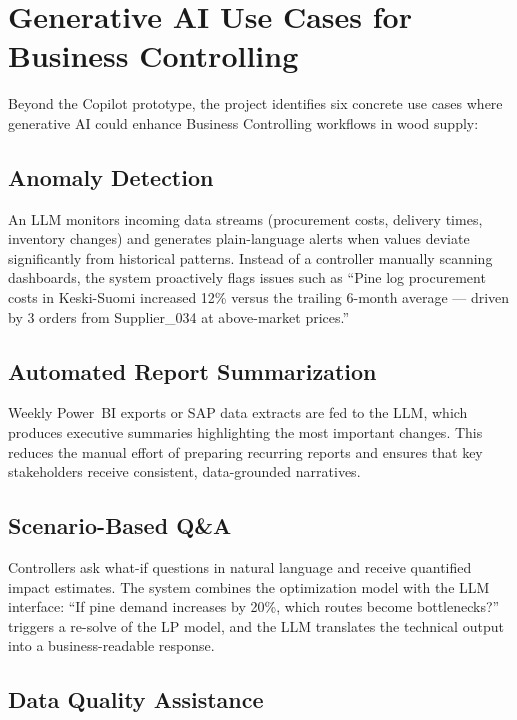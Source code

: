 \documentclass[11pt,a4paper]{article}
\begin{document}
\section{Generative AI Use Cases for Business Controlling}

Beyond the Copilot prototype, the project identifies six concrete use cases where generative AI could enhance Business Controlling workflows in wood supply:

\subsection{Anomaly Detection}

An LLM monitors incoming data streams (procurement costs, delivery times, inventory changes) and generates plain-language alerts when values deviate significantly from historical patterns. Instead of a controller manually scanning dashboards, the system proactively flags issues such as ``Pine log procurement costs in Keski-Suomi increased 12\% versus the trailing 6-month average --- driven by 3 orders from Supplier\_034 at above-market prices.''

\subsection{Automated Report Summarization}

Weekly Power~BI exports or SAP data extracts are fed to the LLM, which produces executive summaries highlighting the most important changes. This reduces the manual effort of preparing recurring reports and ensures that key stakeholders receive consistent, data-grounded narratives.

\subsection{Scenario-Based Q\&A}

Controllers ask what-if questions in natural language and receive quantified impact estimates. The system combines the optimization model with the LLM interface: ``If pine demand increases by 20\%, which routes become bottlenecks?'' triggers a re-solve of the LP model, and the LLM translates the technical output into a business-readable response.

\subsection{Data Quality Assistance}
\end{document}
